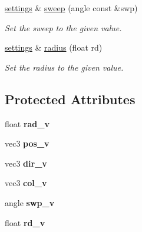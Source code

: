 \begin{DoxyCompactItemize}
\hyperlink{classgfx_1_1spot__light_1_1settings}{settings} \& \hyperlink{classgfx_1_1spot__light_1_1settings_a85a9bf25f0954ef0f59cfc64556a9e9a}{sweep} (angle const \&swp)
\begin{DoxyCompactList}\small\item\em Set the sweep to the given value. \end{DoxyCompactList}\item 
\hyperlink{classgfx_1_1spot__light_1_1settings}{settings} \& \hyperlink{classgfx_1_1spot__light_1_1settings_a772f6d6d796222a84c9478a9a4156bbb}{radius} (float rd)
\begin{DoxyCompactList}\small\item\em Set the radius to the given value. \end{DoxyCompactList}\end{DoxyCompactItemize}
\subsection*{Protected Attributes}
\begin{DoxyCompactItemize}
\item 
\hypertarget{classgfx_1_1spot__light_1_1settings_ad2bc4d60bd53253bcdfee5704b149283}{float {\bfseries rad\-\_\-v}}\label{classgfx_1_1spot__light_1_1settings_ad2bc4d60bd53253bcdfee5704b149283}

\item 
\hypertarget{classgfx_1_1spot__light_1_1settings_ad5519e8b2ccab0f1d60aec354670221d}{vec3 {\bfseries pos\-\_\-v}}\label{classgfx_1_1spot__light_1_1settings_ad5519e8b2ccab0f1d60aec354670221d}

\item 
\hypertarget{classgfx_1_1spot__light_1_1settings_acd4668a9c24c075bf891d980138c9d27}{vec3 {\bfseries dir\-\_\-v}}\label{classgfx_1_1spot__light_1_1settings_acd4668a9c24c075bf891d980138c9d27}

\item 
\hypertarget{classgfx_1_1spot__light_1_1settings_a8fac8c5842a24e1ca9ab817d70953594}{vec3 {\bfseries col\-\_\-v}}\label{classgfx_1_1spot__light_1_1settings_a8fac8c5842a24e1ca9ab817d70953594}

\item 
\hypertarget{classgfx_1_1spot__light_1_1settings_a0f6eb064e3c11f6222d0b88332344eb9}{angle {\bfseries swp\-\_\-v}}\label{classgfx_1_1spot__light_1_1settings_a0f6eb064e3c11f6222d0b88332344eb9}

\item 
\hypertarget{classgfx_1_1spot__light_1_1settings_a34e58abee538bb0f981f34822ef3faa6}{float {\bfseries rd\-\_\-v}}\label{classgfx_1_1spot__light_1_1settings_a34e58abee538bb0f981f34822ef3faa6}

\end{DoxyCompactItemize}
